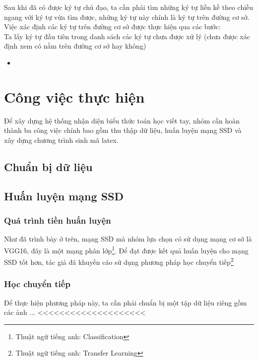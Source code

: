 \documentclass[a4paper,12pt]{article}
\begin{document}
	Sau khi đã có được ký tự chủ đạo, ta cần phải tìm những ký tự liền kề theo chiều ngang với ký tự vừa tìm được, những ký tự này chính là ký tự trên đường cơ sở. Việc xác định các ký tự trên đường cơ sở được thực hiện qua các bước:\\
	
	Ta lấy ký tự đầu tiên trong danh sách các ký tự chưa được xử lý (chưa được xác định xem có nằm trên đường cơ sở hay không)
	
	\begin{itemize}
		\item 
	\end{itemize}

	\section{Công việc thực hiện}
	
	Để xây dựng hệ thống nhận diện biểu thức toán học viết tay, nhóm cần hoàn thành ba công việc chính bao gồm thu thập dữ liệu, huấn luyện mạng SSD và xây dựng chương trình sinh mã latex.
	
	\subsection{Chuẩn bị dữ liệu}
	
	\subsection{Huấn luyện mạng SSD}
	
	\subsubsection{Quá trình tiền huấn luyện}
	Như đã trình bày ở trên, mạng SSD mà nhóm lựa chọn có sử dụng mạng cơ sở là VGG16, đây là một mạng phân lớp\footnote{Thuật ngữ tiếng anh: Classification}. Để đạt được kết quả huấn luyện cho mạng SSD tốt hơn, tác giả đã khuyến cáo sử dụng phương pháp học chuyển tiếp\footnote{Thuật ngữ tiếng anh: Transfer Learning}
	
	\subsubsection*{Học chuyển tiếp}
	
	Để thực hiện phương pháp này, ta cần phải chuẩn bị một tập dữ liệu riêng gồm các ảnh ... <<<<<<<<<<<<<<<<<<<<\\
	
\end{document}
